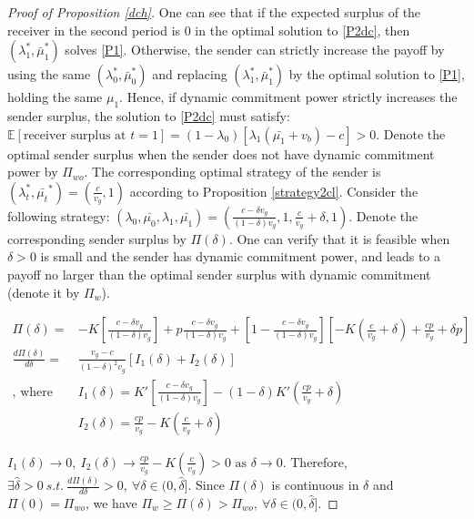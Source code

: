 \documentclass[11pt]{extarticle}
\begin{document}
\begin{proof}[Proof of Proposition \ref{dch}]
	One can see that if the expected surplus of the receiver in the second period is 0 in the optimal solution to \eqref{P2dc}, then $(\lambda_{1}^*,\bar{\mu}_1^*)$ solves \eqref{P1}. Otherwise, the sender can strictly increase the payoff by using the same $(\lambda_{0}^*,\bar{\mu}_0^*)$ and replacing $(\lambda_{1}^*,\bar{\mu}_1^*)$ by the optimal solution to \eqref{P1}, holding the same $\mu_1$. Hence, if dynamic commitment power strictly increases the sender surplus, the solution to \eqref{P2dc} must satisfy: $\mathbb{E}[\text{receiver surplus at }t=1] = (1-\lambda_0) [\lambda_1(\bar{\mu_1}+v_b)-c] > 0$. Denote the optimal sender surplus when the sender does not have dynamic commitment power by $\Pi_{wo}$. The corresponding optimal strategy of the sender is $(\lambda_t^*,\bar{\mu_t}^*)=(\frac{c}{v_g},1)$ according to Proposition \ref{strategy2cl}. Consider the following strategy: $(\lambda_{0},\bar{\mu_0},\lambda_{1},\bar{\mu_1}) = (\frac{c-\delta v_g}{(1-\delta) v_g},1,\frac{c}{v_g}+\delta,1)$. Denote the corresponding sender surplus by $\Pi(\delta)$. One can verify that it is feasible when $\delta > 0$ is small and the sender has dynamic commitment power, and leads to a payoff no larger than the optimal sender surplus with dynamic commitment (denote it by $\Pi_w$). 
	
	\begin{align*}
	\Pi(\delta) =& -K\left[\frac{c-\delta v_g}{(1-\delta) v_g}\right] + p \frac{c-\delta v_g}{(1-\delta) v_g} + \left[1-\frac{c-\delta v_g}{(1-\delta) v_g}\right] \left[-K(\frac{c}{v_g}+\delta)+\frac{cp}{v_g}+\delta p\right]\\
	\frac{d \Pi(\delta)}{d \delta} =& \frac{v_g-c}{(1-\delta)^2 v_g} \left[I_1(\delta)+I_2(\delta)\right]\\
	\text{, where }& I_1(\delta) = K'\left[\frac{c-\delta v_g}{(1-\delta) v_g}\right] - (1-\delta)K'(\frac{cp}{v_g}+\delta)\\
	& I_2(\delta) = \frac{cp}{v_g} - K(\frac{c}{v_g}+\delta)
	\end{align*}
	
	$I_1(\delta) \rightarrow 0,~ I_2(\delta) \rightarrow \frac{cp}{v_g} - K(\frac{c}{v_g}) > 0 \text{ as } \delta \rightarrow 0.$ Therefore, $\exists \widehat{\delta} > 0~s.t.~\frac{d \Pi(\delta)}{d \delta} > 0,~ \forall \delta \in(0,\widehat{\delta}]$. Since $\Pi(\delta)$ is continuous in $\delta$ and $\Pi(0) = \Pi_{wo}$, we have $\Pi_w \geq \Pi(\delta) > \Pi_{wo},~ \forall \delta \in(0,\widehat{\delta}]$.
	

\end{proof}
\end{document}

